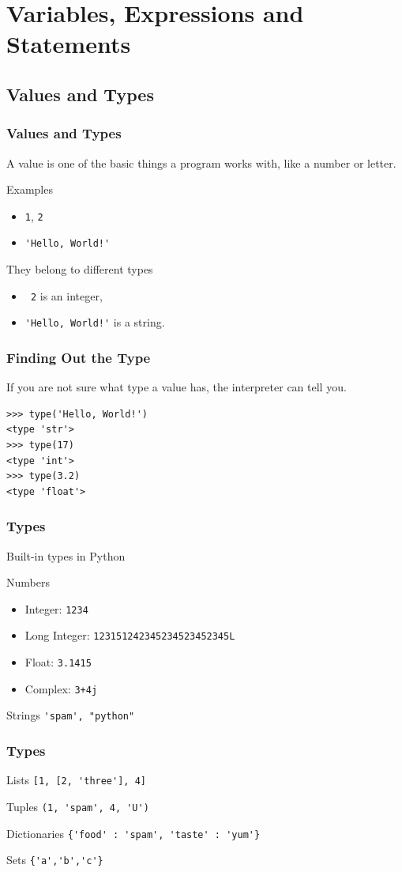 \documentclass{beamer}
\begin{document}
\section{Variables, Expressions and Statements}
\subsection{Values and Types}

\begin{frame}[fragile]
\frametitle{Values and Types}
A \alert{value} is one of the basic things a program works with, like a \alert{number} or \alert{letter}.  
\begin{block}{Examples}
\begin{itemize}
\item \texttt{1}, \texttt{2}
\item \verb"'Hello, World!'"
\end{itemize}
\end{block}
They belong to different \alert{types}
\begin{itemize}
\item \texttt{ 2} is an \alert{integer}, 
\item \verb"'Hello, World!'" is a \alert{ string}.
\end{itemize}
\end{frame}
\begin{frame}[fragile]
\frametitle{Finding Out the Type}
If you are not sure what type a value has, the interpreter can tell you.
\begin{verbatim}
>>> type('Hello, World!')
<type 'str'>
>>> type(17)
<type 'int'>
>>> type(3.2)
<type 'float'>
\end{verbatim}
\end{frame}
\begin{frame}[fragile]
\frametitle{Types}
Built-in types in Python
\begin{block}{Numbers}
\begin{itemize} 
\item  Integer: \verb"1234"
\item Long Integer: \verb"123151242345234523452345L"
\item Float:  \verb"3.1415"
\item Complex: \verb"3+4j"
\end{itemize}
\end{block}
\begin{block}{Strings}
\verb!'spam', "python"!
\end{block}
\end{frame}
\begin{frame}[fragile]
\frametitle{Types}
\begin{block}{Lists}
\verb![1, [2, 'three'], 4]!
\end{block}
\begin{block}{Tuples}
\verb!(1, 'spam', 4, 'U')!
\end{block}
\begin{block}{Dictionaries}
\verb!{'food' : 'spam', 'taste' : 'yum'}!
\end{block}
\begin{block}{Sets}
\verb!{'a','b','c'}!
\end{block}
\end{frame}
\end{document}
